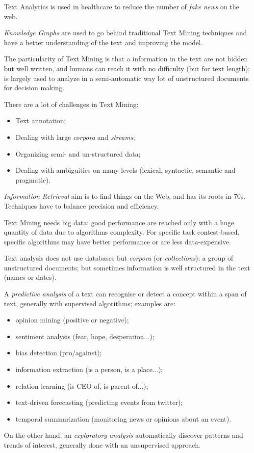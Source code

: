 \documentclass[11pt, a4page]{article}
\begin{document}
Text Analytics is used in healthcare to reduce the number of \textit{fake news} on the web.

\textit{Knowledge Graphs} are used to go behind traditional Text Mining techniques and have a better understanding of the text and improving the model.

The particularity of Text Mining is that a information in the text are not hidden but well written, and humans can reach it with no difficulty (but for text length); is largely used to analyze in a semi-automatic way lot of unstructured documents for decision making.

There are a lot of challenges in Text Mining:
\begin{itemize}[noitemsep]
\item Text annotation;
\item Dealing with large \textit{corpora} and \textit{streams};
\item Organizing semi- and un-structured data;
\item Dealing with ambiguities on many levels (lexical, syntactic, semantic and pragmatic).
\end{itemize}

\textit{Information Retrieval} aim is to find things on the Web, and has its roots in 70s.
Techniques have to balance precision and efficiency.

Text Mining needs big data: good performance are reached only with a huge quantity of data due to algorithms complexity.
For specific task contest-based, specific algorithms may have better performance or are less data-expensive.

Text analysis does not use databases but \textit{corpora} (or \textit{collections}): a group of unstructured documents; but sometimes information is well structured in the text (names or dates).

A \textit{predictive analysis} of a text can recognise or detect a concept within a span of text, generally with supervised algorithms; examples are:
\begin{itemize}[noitemsep]
\item opinion mining (positive or negative);
\item sentiment analysis (fear, hope, desperation...);
\item bias detection (pro/against);
\item information extraction (is a person, is a place...);
\item relation learning (is CEO of, is parent of...);
\item text-driven forecasting (predicting events from twitter);
\item temporal summarization (monitoring news or opinions about an event).
\end{itemize}
On the other hand, an \textit{exploratory analysis} automatically discover patterns and trends of interest, generally done with an unsupervised approach.
\end{document}
